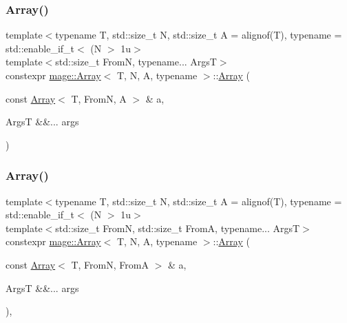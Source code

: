\mbox{\label{structmage_1_1_array_a128de416259f75f7b4ab8ab2e1ba9bd7}} 
\subsubsection{\texorpdfstring{Array()}{Array()}\hspace{0.1cm}{\footnotesize\ttfamily [6/10]}}
{\footnotesize\ttfamily template$<$typename T, std\+::size\+\_\+t N, std\+::size\+\_\+t A = alignof(\+T), typename  = std\+::enable\+\_\+if\+\_\+t$<$ (\+N $>$ 1u$>$ \\
template$<$std\+::size\+\_\+t FromN, typename... ArgsT$>$ \\
constexpr \mbox{\hyperlink{structmage_1_1_array}{mage\+::\+Array}}$<$ T, N, A, typename $>$\+::\mbox{\hyperlink{structmage_1_1_array}{Array}} (\begin{DoxyParamCaption}\item[{const \mbox{\hyperlink{structmage_1_1_array}{Array}}$<$ T, FromN, A $>$ \&}]{a,  }\item[{ArgsT \&\&...}]{args }\end{DoxyParamCaption})\hspace{0.3cm}{\ttfamily [noexcept]}}

\mbox{\label{structmage_1_1_array_a4952f767cdedb8c2874391dc4d9b74c3}} 
\subsubsection{\texorpdfstring{Array()}{Array()}\hspace{0.1cm}{\footnotesize\ttfamily [7/10]}}
{\footnotesize\ttfamily template$<$typename T, std\+::size\+\_\+t N, std\+::size\+\_\+t A = alignof(\+T), typename  = std\+::enable\+\_\+if\+\_\+t$<$ (\+N $>$ 1u$>$ \\
template$<$std\+::size\+\_\+t FromN, std\+::size\+\_\+t FromA, typename... ArgsT$>$ \\
constexpr \mbox{\hyperlink{structmage_1_1_array}{mage\+::\+Array}}$<$ T, N, A, typename $>$\+::\mbox{\hyperlink{structmage_1_1_array}{Array}} (\begin{DoxyParamCaption}\item[{const \mbox{\hyperlink{structmage_1_1_array}{Array}}$<$ T, FromN, FromA $>$ \&}]{a,  }\item[{ArgsT \&\&...}]{args }\end{DoxyParamCaption})\hspace{0.3cm}{\ttfamily [explicit]}, {\ttfamily [noexcept]}}

